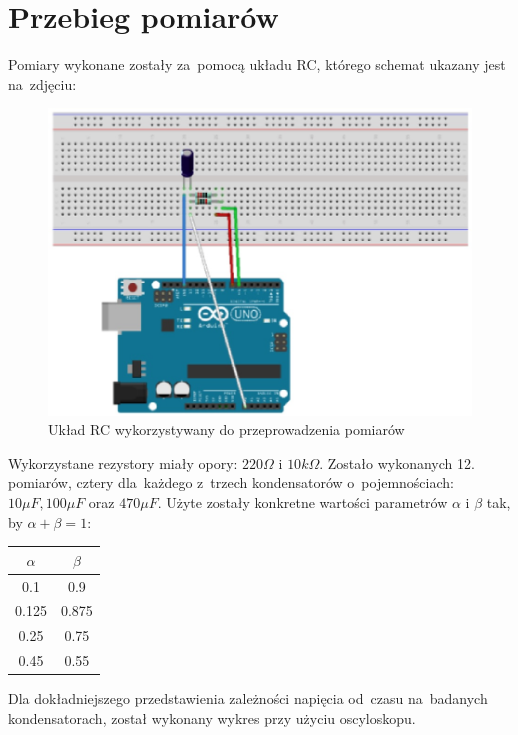 \documentclass[12pt]{mwart}
\begin{document}
	\section{Przebieg pomiarów}
	\noindent Pomiary wykonane zostały za~pomocą układu RC, którego schemat ukazany jest na~zdjęciu:
	\begin{figure}[H]
		\centering
		\includegraphics[scale = 0.5]{data/schemat.jpg}
		\caption{Układ RC wykorzystywany do przeprowadzenia pomiarów}
	\end{figure}
	\noindent Wykorzystane rezystory miały opory: $220\Omega$ i $10k\Omega$.
	Zostało wykonanych 12. pomiarów, cztery dla~każdego z~trzech kondensatorów o~pojemnościach: $10\mu F, 100\mu F$ oraz $470\mu F$. Użyte zostały konkretne wartości parametrów $\alpha$ i $\beta$ tak, by $\alpha+\beta=1$:
	\begin{table}[H] %
		\centering
		\begin{tabular}{c|c}
			\hline
			$\alpha$ & $\beta$ \\ \hline
			0.1 & 0.9  \\ \hline
			0.125 & 0.875  \\ \hline
			0.25 & 0.75 \\ \hline
			0.45 & 0.55  \\ \hline
		\end{tabular}
	\end{table}
	\noindent Dla dokładniejszego przedstawienia zależności napięcia od~czasu na~badanych kondensatorach, został wykonany wykres przy użyciu oscyloskopu. %
\end{document}
